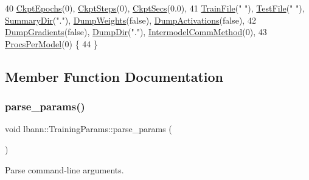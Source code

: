 \begin{DoxyCode}
40     \hyperlink{classlbann_1_1TrainingParams_ad113dc144a2c77609091fd36fc5816bf}{CkptEpochs}(0), \hyperlink{classlbann_1_1TrainingParams_a3b1ec8d02290b369572c99b39b7d8637}{CkptSteps}(0), \hyperlink{classlbann_1_1TrainingParams_ac23d388e43cb227aa72196c8b8102b92}{CkptSecs}(0.0),
41     \hyperlink{classlbann_1_1TrainingParams_a4ac278410cb0a24c9dc1f6edf014d003}{TrainFile}(\textcolor{stringliteral}{" "}), \hyperlink{classlbann_1_1TrainingParams_a99502fc87d50df2055a992266fdeee05}{TestFile}(\textcolor{stringliteral}{" "}), \hyperlink{classlbann_1_1TrainingParams_ad01ff40b34ff8b7adf4c547aa60ee87f}{SummaryDir}(\textcolor{stringliteral}{"."}), 
      \hyperlink{classlbann_1_1TrainingParams_a58022c3da1e279e0a209cb5f90677aa7}{DumpWeights}(\textcolor{keyword}{false}), \hyperlink{classlbann_1_1TrainingParams_a4707689cbc2dd7cd45d05bf18026f2f4}{DumpActivations}(\textcolor{keyword}{false}),
42     \hyperlink{classlbann_1_1TrainingParams_a88d652f4579b464ce6d961712d7b0235}{DumpGradients}(\textcolor{keyword}{false}), \hyperlink{classlbann_1_1TrainingParams_a56e113da8b3b5acc6a26ac710c1d77d8}{DumpDir}(\textcolor{stringliteral}{"."}), \hyperlink{classlbann_1_1TrainingParams_aa30088e066d4d5cf2d2007667aef7a8a}{IntermodelCommMethod}(0),
43     \hyperlink{classlbann_1_1TrainingParams_afd0c134f11e1f44d8a07a55f86f3cfa0}{ProcsPerModel}(0) \{
44 \}
\end{DoxyCode}


\subsection{Member Function Documentation}
\mbox{\label{classlbann_1_1TrainingParams_a245c0674a2132cb15f1198b1f4dd2bf8}} 
\subsubsection{\texorpdfstring{parse\+\_\+params()}{parse\_params()}}
{\footnotesize\ttfamily void lbann\+::\+Training\+Params\+::parse\+\_\+params (\begin{DoxyParamCaption}{ }\end{DoxyParamCaption})}



Parse command-\/line arguments. 



